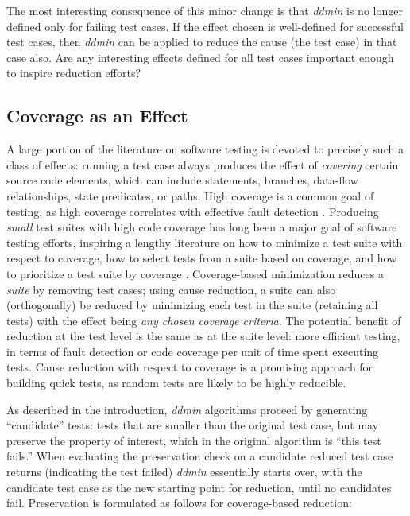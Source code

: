 The most interesting consequence of this minor change is that
\emph{ddmin} is no longer defined only for failing test cases.  If the
effect chosen is well-defined for successful test cases,
then \emph{ddmin} can be applied to reduce the cause (the test case)
in that case also.  Are any interesting
effects defined for all test cases important enough to inspire reduction efforts?

\subsection{Coverage as an Effect}

A large portion of the literature on software testing is devoted to
precisely such a class of effects: running a test case always produces
the effect of \emph{covering} certain source code elements, which can
include statements, branches, data-flow relationships, state
predicates, or paths.  High coverage is a common
goal of testing, as high coverage correlates with effective fault
detection \cite{ISSTA13}.  Producing \emph {small} test
suites with high code coverage \cite{Harder} has long been a major
goal of software testing efforts, inspiring a lengthy literature on
how to minimize a test suite with respect to coverage, how to select
tests from a suite based on coverage, and how to prioritize a test
suite by coverage \cite{YooHarman}.  Coverage-based minimization
reduces a \emph{suite} by removing test cases; using cause reduction,
a suite can also (orthogonally) be reduced by minimizing each test in
the suite (retaining all tests) with the effect being \emph{any chosen
coverage criteria}.  The potential benefit of reduction at the test
level is the same as at the suite level: more
efficient testing, in terms of fault detection or code coverage per
unit of time spent executing tests.  Cause reduction with respect to
coverage is a promising approach for building quick tests, as random
tests are likely to be highly reducible.

As described in the introduction, \emph{ddmin} algorithms proceed by
generating ``candidate'' tests: tests that are smaller than the
original test case, but may preserve the property of interest, which
in the original algorithm is ``this test fails.''  When evaluating the
preservation check on a candidate reduced test case returns 
(indicating the test failed) \emph{ddmin} essentially starts over,
with the candidate test case as the new starting point for reduction,
until no candidates fail.  Preservation is formulated as follows
for coverage-based reduction:

